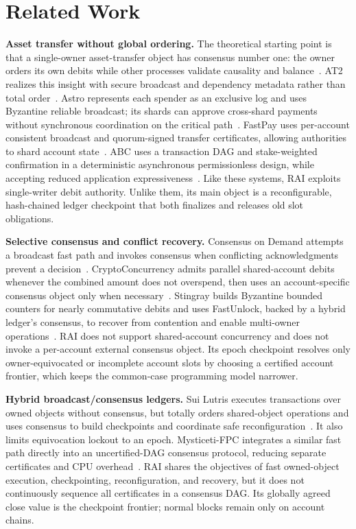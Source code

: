 \documentclass[sigplan,review,anonymous]{acmart}
\newcommand{\sys}{\textsc{RAI}\xspace}
\newcommand{\paragraphhead}[1]{\smallskip\noindent\textbf{#1}}
\begin{document}
\section{Related Work}
\label{sec:related}

\paragraphhead{Asset transfer without global ordering.}
The theoretical starting point is that a single-owner asset-transfer object has consensus number one: the owner orders its own debits while other processes validate causality and balance~\cite{guerraoui2019consensusnumber}.  AT2 realizes this insight with secure broadcast and dependency metadata rather than total order~\cite{guerraoui2019at2}.  Astro represents each spender as an exclusive log and uses Byzantine reliable broadcast; its shards can approve cross-shard payments without synchronous coordination on the critical path~\cite{collins2020astro}.  FastPay uses per-account consistent broadcast and quorum-signed transfer certificates, allowing authorities to shard account state~\cite{baudet2020fastpay}.  ABC uses a transaction DAG and stake-weighted confirmation in a deterministic asynchronous permissionless design, while accepting reduced application expressiveness~\cite{sliwinski2019abc}.  Like these systems, \sys exploits single-writer debit authority.  Unlike them, its main object is a reconfigurable, hash-chained ledger checkpoint that both finalizes and releases old slot obligations.

\paragraphhead{Selective consensus and conflict recovery.}
Consensus on Demand attempts a broadcast fast path and invokes consensus when conflicting acknowledgments prevent a decision~\cite{sliwinski2022cod}.  CryptoConcurrency admits parallel shared-account debits whenever the combined amount does not overspend, then uses an account-specific consensus object only when necessary~\cite{tonkikh2023cryptoconcurrency}.  Stingray builds Byzantine bounded counters for nearly commutative debits and uses FastUnlock, backed by a hybrid ledger's consensus, to recover from contention and enable multi-owner operations~\cite{sridhar2025stingray}.  \sys does not support shared-account concurrency and does not invoke a per-account external consensus object.  Its epoch checkpoint resolves only owner-equivocated or incomplete account slots by choosing a certified account frontier, which keeps the common-case programming model narrower.

\paragraphhead{Hybrid broadcast/consensus ledgers.}
Sui Lutris executes transactions over owned objects without consensus, but totally orders shared-object operations and uses consensus to build checkpoints and coordinate safe reconfiguration~\cite{blackshear2024suilutris}.  It also limits equivocation lockout to an epoch.  Mysticeti-FPC integrates a similar fast path directly into an uncertified-DAG consensus protocol, reducing separate certificates and CPU overhead~\cite{babel2025mysticeti}.  \sys shares the objectives of fast owned-object execution, checkpointing, reconfiguration, and recovery, but it does not continuously sequence all certificates in a consensus DAG.  Its globally agreed close value is the checkpoint frontier; normal blocks remain only on account chains.
\end{document}

